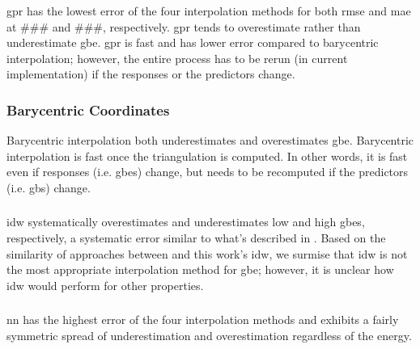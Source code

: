 \documentclass[preprint,12pt]{elsarticle}
\begin{document}
\subsubsection{} \label{results:mdlerror:gpr}
\Gls{gpr} has the lowest error of the four interpolation methods for both \gls{rmse} and \gls{mae} at \#\#\# and \#\#\#, respectively. \Gls{gpr} tends to overestimate rather than underestimate \gls{gbe}. \Gls{gpr} is fast and has lower error compared to barycentric interpolation; however, the entire process has to be rerun (in current implementation) if the responses or the predictors change.

\subsubsection{Barycentric Coordinates} \label{results:mdlerror:bary}
Barycentric interpolation both underestimates and overestimates \gls{gbe}. Barycentric interpolation is fast once the triangulation is computed. In other words, it is fast even if responses (i.e. \glspl{gbe}) change, but needs to be recomputed if the predictors (i.e. \glspl{gb}) change.

\subsubsection{} \label{results:mdlerror:idw}
\Gls{idw} systematically overestimates and underestimates low and high \glspl{gbe}, respectively, a systematic error similar to what's described in \cite{chesserLearningGrainBoundary2020}. Based on the similarity of approaches between \cite{chesserLearningGrainBoundary2020} and this work's \gls{idw}, we surmise that \gls{idw} is not the most appropriate interpolation method for \gls{gbe}; however, it is unclear how \gls{idw} would perform for other properties.

\subsubsection{} \label{results:mdlerror:nn}
\Gls{nn} has the highest error of the four interpolation methods and exhibits a fairly symmetric spread of underestimation and overestimation regardless of the energy.
    
\end{document}
